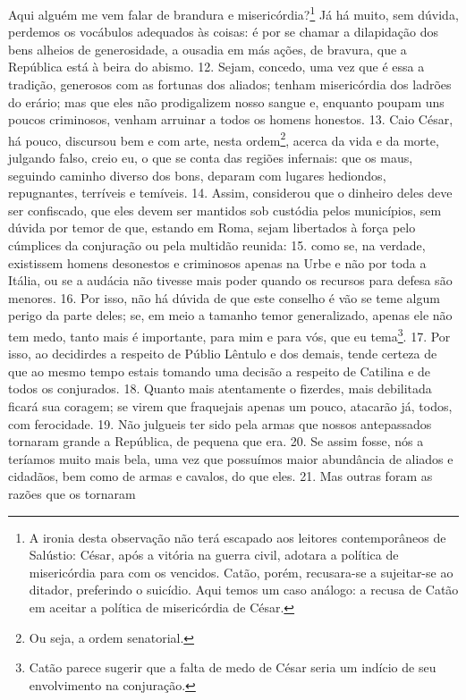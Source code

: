 Aqui alguém me vem falar de brandura e misericórdia?\footnote{A ironia desta
observação não terá escapado aos leitores contemporâneos de Salústio: César,
após a vitória na guerra civil, adotara a política de misericórdia para com os
vencidos. Catão, porém, recusara-se a sujeitar-se ao ditador, preferindo o
suicídio. Aqui temos um caso análogo: a recusa de Catão em aceitar a política
de misericórdia de César.} Já há muito, sem dúvida, perdemos os vocábulos
adequados às coisas: é por se chamar a dilapidação dos bens alheios de
generosidade, a ousadia em más ações, de bravura, que a República está à beira
do abismo. 12. Sejam, concedo, uma vez que é essa a tradição, generosos com as
fortunas dos aliados; tenham misericórdia dos ladrões do erário; mas que eles
não prodigalizem nosso sangue e, enquanto poupam uns poucos criminosos, venham
arruinar a todos os homens honestos. 13. Caio César, há pouco, discursou bem e
com arte, nesta ordem\footnote{Ou seja, a ordem senatorial.}, acerca da vida e
da morte, julgando falso, creio eu, o que se conta das regiões infernais: que
os maus, seguindo caminho diverso dos bons, deparam com lugares hediondos,
repugnantes, terríveis e temíveis. 14. Assim, considerou que o dinheiro deles deve
ser confiscado, que eles devem ser mantidos sob custódia pelos
municípios, sem dúvida por temor de que, estando em Roma, sejam libertados à
força pelo cúmplices da conjuração ou pela multidão reunida: 15. como se, na
verdade, existissem homens desonestos e criminosos apenas na Urbe e não por
toda a Itália, ou se a audácia não tivesse mais poder quando os recursos para
defesa são menores. 16. Por isso, não há dúvida de que este conselho é vão se
teme algum perigo da parte deles; se, em meio a tamanho temor generalizado,
apenas ele não tem medo, tanto mais é importante, para mim e para vós, que eu
tema\footnote{Catão parece sugerir que a falta de medo de César seria um indício de seu
envolvimento na conjuração.}. 17. Por isso, ao decidirdes a respeito de Públio
Lêntulo e dos demais, tende certeza de que ao mesmo tempo estais tomando uma
decisão a respeito de Catilina e de todos os conjurados. 18. Quanto mais
atentamente o fizerdes, mais debilitada ficará sua coragem; se virem que
fraquejais apenas um pouco, atacarão já, todos, com ferocidade. 19. Não
julgueis ter sido pela armas que nossos antepassados tornaram grande a
República, de pequena que era. 20. Se assim fosse, nós a teríamos muito mais
bela, uma vez que possuímos maior abundância de aliados e cidadãos, bem como de
armas e cavalos, do que eles. 21. Mas outras foram as razões que os tornaram
